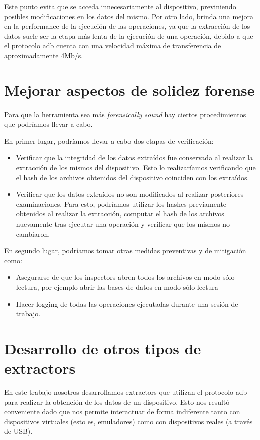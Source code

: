 Este punto evita que se acceda innecesariamente al dispositivo, previniendo posibles modificaciones en los datos del mismo. Por otro lado, brinda una mejora en la performance de la ejecución de las operaciones, ya que la extracción de los datos suele ser la etapa más lenta de la ejecución de una operación, debido a que el protocolo adb cuenta con una velocidad máxima de transferencia de aproximadamente 4Mb/s.

\section{Mejorar aspectos de solidez forense}
Para que la herramienta sea más \emph{forensically sound} hay ciertos procedimientos que podríamos llevar a cabo.

En primer lugar, podríamos llevar a cabo dos etapas de verificación:
\begin{itemize}
\item Verificar que la integridad de los datos extraídos fue conservada al realizar la extracción de los mismos del dispositivo. Esto lo realizaríamos verificando que el hash de los archivos obtenidos del dispositivo coinciden con los extraídos.
\item Verificar que los datos extraídos no son modificados al realizar posteriores examinaciones. Para esto, podríamos utilizar los hashes previamente obtenidos al realizar la extracción, computar el hash de los archivos nuevamente tras ejecutar una operación y verificar que los mismos no cambiaron.
\end{itemize}

En segundo lugar, podríamos tomar otras medidas preventivas y de mitigación como:
\begin{itemize}
\item Asegurarse de que los inspectors abren todos los archivos en modo sólo lectura, por ejemplo abrir las bases de datos en modo sólo lectura
\item Hacer logging de todas las operaciones ejecutadas durante una sesión de trabajo.
\end{itemize}

\section{Desarrollo de otros tipos de extractors}
En este trabajo nosotros desarrollamos extractors que utilizan el protocolo adb para realizar la obtención de los datos de un dispositivo. Esto nos resultó conveniente dado que nos permite interactuar de forma indiferente tanto con dispositivos virtuales (esto es, emuladores) como con dispositivos reales (a través de USB).

